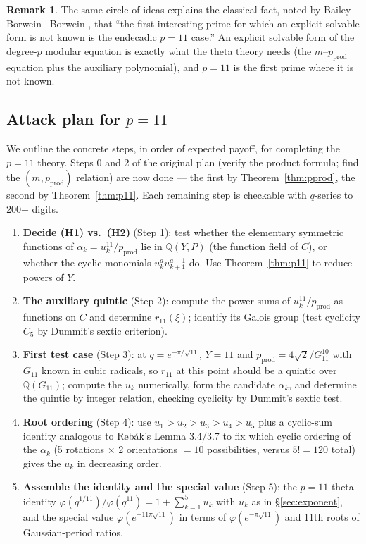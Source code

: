 \documentclass[11pt]{amsart}
\theoremstyle{plain}
\theoremstyle{definition}
\newtheorem{remark}[theorem]{Remark}
\theoremstyle{remark}
\newcommand{\Q}{\mathbb{Q}}
\newcommand{\pprod}{p_{\mathrm{prod}}}
\begin{document}
\begin{remark}
The same circle of ideas explains the classical fact, noted by Bailey--Borwein--
Borwein \cite{BBB89}, that ``the first interesting prime for which an explicit
solvable form is not known is the endecadic $p=11$ case.'' An explicit solvable form
of the degree-$p$ modular equation is exactly what the theta theory needs (the
$m$--$\pprod$ equation plus the auxiliary polynomial), and $p=11$ is the first
prime where it is not known.
\end{remark}

\subsection{Attack plan for $p=11$}

We outline the concrete steps, in order of expected payoff, for completing the
$p=11$ theory. Steps 0 and 2 of the original plan (verify the product formula;
find the $(m,\pprod)$ relation) are now done --- the first by
Theorem~\ref{thm:pprod}, the second by Theorem~\ref{thm:p11}. Each remaining step
is checkable with $q$-series to 200+ digits.
\begin{enumerate}
\item \textbf{Decide (H1) vs.\ (H2)} (Step 1): test whether the elementary symmetric
functions of $\alpha_k = u_k^{11}/\pprod$ lie in $\Q(Y,P)$ (the function field of
$C$), or whether the cyclic monomials $u_k^a u_{k+1}^{a-1}$ do. Use
Theorem~\ref{thm:p11} to reduce powers of $Y$.
\item \textbf{The auxiliary quintic} (Step 2): compute the power sums of
$u_k^{11}/\pprod$ as functions on $C$ and determine $r_{11}(\xi)$; identify its
Galois group (test cyclicity $C_5$ by Dummit's sextic criterion).
\item \textbf{First test case} (Step 3): at $q = e^{-\pi/\sqrt{11}}$,
$Y = 11$ and $\pprod = 4\sqrt{2}/G_{11}^{10}$ with $G_{11}$ known in cubic radicals,
so $r_{11}$ at this point should be a quintic over $\Q(G_{11})$; compute the $u_k$
numerically, form the candidate $\alpha_k$, and determine the quintic by integer
relation, checking cyclicity by Dummit's sextic test.
\item \textbf{Root ordering} (Step 4): use $u_1 > u_2 > u_3 > u_4 > u_5$ plus a
cyclic-sum identity analogous to Reb\'ak's Lemma 3.4/3.7 to fix which cyclic ordering
of the $\alpha_k$ (5 rotations $\times$ 2 orientations $= 10$ possibilities, versus
$5! = 120$ total) gives the $u_k$ in decreasing order.
\item \textbf{Assemble the identity and the special value} (Step 5): the $p=11$ theta
identity $\varphi(q^{1/11})/\varphi(q^{11}) = 1 + \sum_{k=1}^5 u_k$ with $u_k$ as in
\S\ref{sec:exponent}, and the special value $\varphi(e^{-11\pi\sqrt{11}})$ in terms
of $\varphi(e^{-\pi\sqrt{11}})$ and 11th roots of Gaussian-period ratios.
\end{enumerate}
\end{document}
